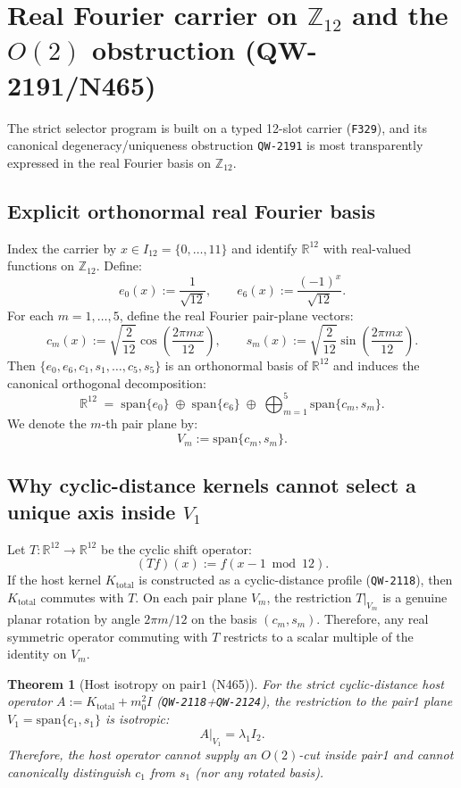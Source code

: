 \documentclass[11pt,a4paper]{article}
\newtheorem{theorem}{Theorem}[section]
\begin{document}
\section{Real Fourier carrier on \texorpdfstring{$\mathbb{Z}_{12}$}{Z\_12} and the \texorpdfstring{$O(2)$}{O(2)} obstruction (QW-2191/N465)}
\label{sec:fourier_z12_obstruction}

The strict selector program is built on a typed 12-slot carrier (\texttt{F329}), and its canonical degeneracy/uniqueness obstruction \texttt{QW-2191}
is most transparently expressed in the real Fourier basis on $\mathbb{Z}_{12}$.

\subsection{Explicit orthonormal real Fourier basis}
Index the carrier by $x\in I_{12}=\{0,\dots,11\}$ and identify $\mathbb{R}^{12}$ with real-valued functions on $\mathbb{Z}_{12}$.
Define:
\[
e_0(x):=\frac{1}{\sqrt{12}},
\qquad
e_6(x):=\frac{(-1)^x}{\sqrt{12}}.
\]
For each $m=1,\dots,5$, define the real Fourier pair-plane vectors:
\[
c_m(x):=\sqrt{\frac{2}{12}}\cos\!\left(\frac{2\pi m x}{12}\right),
\qquad
s_m(x):=\sqrt{\frac{2}{12}}\sin\!\left(\frac{2\pi m x}{12}\right).
\]
Then $\{e_0,e_6,c_1,s_1,\dots,c_5,s_5\}$ is an orthonormal basis of $\mathbb{R}^{12}$ and induces the canonical orthogonal decomposition:
\[
\mathbb{R}^{12}
\;=\;
\mathrm{span}\{e_0\}
\;\oplus\;
\mathrm{span}\{e_6\}
\;\oplus\;
\bigoplus_{m=1}^{5}\mathrm{span}\{c_m,s_m\}.
\]
We denote the $m$-th pair plane by:
\[
V_m:=\mathrm{span}\{c_m,s_m\}.
\]

\subsection{Why cyclic-distance kernels cannot select a unique axis inside \texorpdfstring{$V_1$}{V1}}
Let $T:\mathbb{R}^{12}\to\mathbb{R}^{12}$ be the cyclic shift operator:
\[
(Tf)(x):=f(x-1\bmod 12).
\]
If the host kernel $K_{\mathrm{total}}$ is constructed as a cyclic-distance profile (\texttt{QW-2118}),
then $K_{\mathrm{total}}$ commutes with $T$.
On each pair plane $V_m$, the restriction $T|_{V_m}$ is a genuine planar rotation by angle $2\pi m/12$ on the basis $(c_m,s_m)$.
Therefore, any real symmetric operator commuting with $T$ restricts to a scalar multiple of the identity on $V_m$.

\begin{theorem}[Host isotropy on \texorpdfstring{$\mathrm{pair1}$}{pair1} (N465)]
For the strict cyclic-distance host operator $A:=K_{\mathrm{total}}+m_0^2 I$ (\texttt{QW-2118}+\texttt{QW-2124}), the restriction to the pair1 plane
$V_1=\mathrm{span}\{c_1,s_1\}$ is isotropic:
\[
A|_{V_1}=\lambda_1 I_2.
\]
Therefore, the host operator cannot supply an $O(2)$-cut inside pair1 and cannot canonically distinguish $c_1$ from $s_1$ (nor any rotated basis).
\end{theorem}
\end{document}
